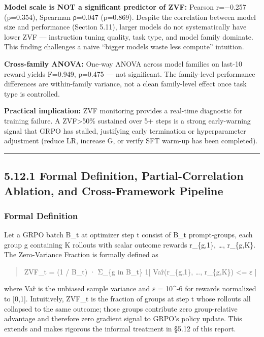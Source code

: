 \documentclass[
  american,
  11pt,
  a4paper,
  oneside]{report}
\begin{document}
\textbf{Model scale is NOT a significant predictor of ZVF:} Pearson
r=−0.257 (p=0.354), Spearman ρ=0.047 (p=0.869). Despite the correlation
between model size and performance (Section 5.11), larger models do not
systematically have lower ZVF --- instruction tuning quality, task type,
and model family dominate. This finding challenges a naive ``bigger
models waste less compute'' intuition.

\textbf{Cross-family ANOVA:} One-way ANOVA across model families on
last-10 reward yields F=0.949, p=0.475 --- not significant. The
family-level performance differences are within-family variance, not a
clean family-level effect once task type is controlled.

\textbf{Practical implication:} ZVF monitoring provides a real-time
diagnostic for training failure. A ZVF\textgreater50\% sustained over 5+
steps is a strong early-warning signal that GRPO has stalled, justifying
early termination or hyperparameter adjustment (reduce LR, increase G,
or verify SFT warm-up has been completed).

\begin{center}\rule{0.5\linewidth}{0.5pt}\end{center}

\subsection{5.12.1 Formal Definition, Partial-Correlation Ablation, and
Cross-Framework
Pipeline}\label{formal-definition-partial-correlation-ablation-and-cross-framework-pipeline}

\subsubsection{Formal Definition}\label{formal-definition}

Let a GRPO batch B\_t at optimizer step t consist of
\textbar B\_t\textbar{} prompt-groups, each group g containing K
rollouts with scalar outcome rewards r\_\{g,1\}, \ldots, r\_\{g,K\}. The
Zero-Variance Fraction is formally defined as

\begin{quote}
ZVF\_t = (1 / \textbar B\_t\textbar) · Σ\_\{g in B\_t\} 1{[}
Var̂(r\_\{g,1\}, \ldots, r\_\{g,K\}) \textless= ε {]}
\end{quote}

where Var̂ is the unbiased sample variance and ε = 10\^{}-6 for rewards
normalized to {[}0,1{]}. Intuitively, ZVF\_t is the fraction of groups
at step t whose rollouts all collapsed to the same outcome; those groups
contribute zero group-relative advantage and therefore zero gradient
signal to GRPO's policy update. This extends and makes rigorous the
informal treatment in §5.12 of this report.
\end{document}
